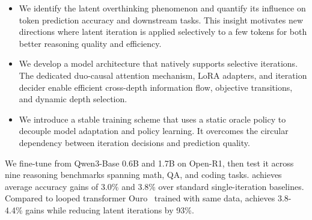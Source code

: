 \begin{itemize}
    \item {}
    We identify the latent overthinking phenomenon and quantify its influence on token prediction accuracy and downstream tasks.
    This insight motivates new directions where latent iteration is applied selectively to a few tokens for both better reasoning quality and efficiency.
    \item {}
    We develop a model architecture that natively supports selective iterations.
    The dedicated duo-causal attention mechanism, LoRA adapters, and iteration decider enable efficient cross-depth information flow, objective transitions, and dynamic depth selection.
    \item {}
    We introduce a stable training scheme that uses a static oracle policy to decouple model adaptation and policy learning. It overcomes the circular dependency between iteration decisions and prediction quality.
\end{itemize}

We fine-tune \name from Qwen3-Base 0.6B and 1.7B on Open-R1, then test it across nine reasoning benchmarks spanning math, QA, and coding tasks. \name achieves average accuracy gains of 3.0\% and 3.8\% over standard single-iteration baselines.
Compared to looped transformer Ouro~\citep{zhu2025ouro} trained with same data, \name achieves 3.8-4.4\% gains while reducing latent iterations by 93\%.
